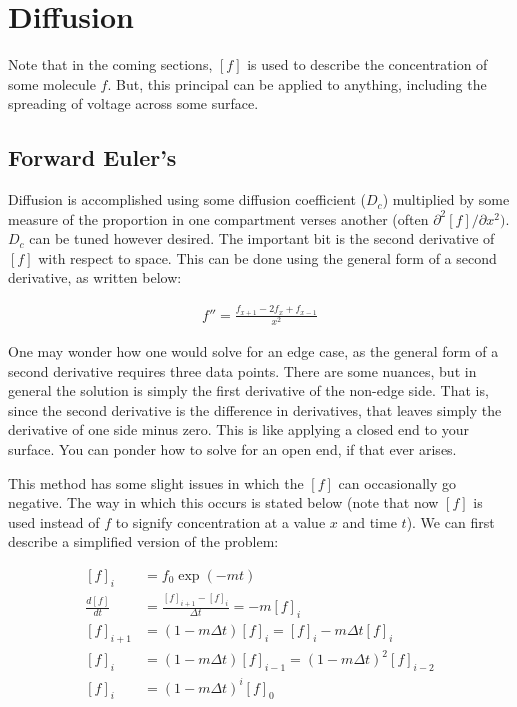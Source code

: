 \documentclass[12pt]{report}
\begin{document}
\section{Diffusion}

 Note that in the coming sections, $[f]$ is used to describe the concentration of some molecule $f$. But, this principal can be applied to anything, including the spreading of voltage across some surface. 

\subsection{Forward Euler's} Diffusion is accomplished using some diffusion coefficient ($D_c$) multiplied by some measure of the proportion in one compartment verses another (often $\partial^2 [f]/\partial x^2)$. $D_c$ can be tuned however desired. The important bit is the second derivative of $[f]$ with respect to space. This can be done using the general form of a second derivative, as written below: 

\begin{equation} \label{diff1}
\begin{split}
f'' = \frac{f_{x + 1} - 2f_x + f_{x - 1}}{x^2}
\end{split}
\end{equation}

\bigskip

One may wonder how one would solve for an edge case, as the general form of a second derivative requires three data points. There are some nuances, but in general the solution is simply the first derivative of the non-edge side. That is, since the second derivative is the difference in derivatives, that leaves simply the derivative of one side minus zero. This is like applying a closed end to your surface. You can ponder how to solve for an open end, if that ever arises.\newline

This method has some slight issues in which the $[f]$ can occasionally go negative. The way in which this occurs is stated below (note that now $[f]$ is used instead of $f$ to signify concentration at a value $x$ and time $t$). We can first describe a simplified version of the problem:

\begin{equation} \label{diff2}
\begin{split}
[f]_i & = f_0\exp(-mt) \\
\frac{d[f]}{dt} & = \frac{[f]_{i+1} - [f]_{i}}{\Delta t} = -m[f]_i \\
[f]_{i+1} & = (1-m\Delta t)[f]_i = [f]_i - m\Delta t [f]_i \\
[f]_{i} & = (1-m\Delta t)[f]_{i-1} = (1-m\Delta t)^2[f]_{i-2} \\
[f]_{i} & = (1-m\Delta t)^i[f]_{0} \\
\end{split}
\end{equation}
\end{document}
